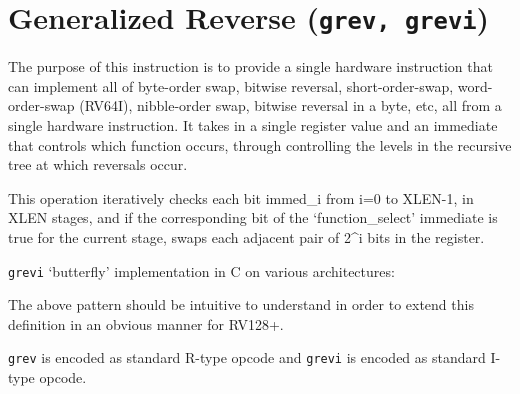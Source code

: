 
\section{Generalized Reverse (\texttt{grev,\ grevi})}

The purpose of this instruction is to provide a single hardware
instruction that can implement all of byte-order swap, bitwise reversal,
short-order-swap, word-order-swap (RV64I), nibble-order swap, bitwise
reversal in a byte, etc, all from a single hardware instruction. It
takes in a single register value and an immediate that controls which
function occurs, through controlling the levels in the recursive tree at
which reversals occur.

This operation iteratively checks each bit immed\_i from i=0 to XLEN-1,
in XLEN stages, and if the corresponding bit of the `function\_select'
immediate is true for the current stage, swaps each adjacent pair of
2\^{}i bits in the register.

\texttt{grevi} `butterfly' implementation in C on various architectures:



The above pattern should be intuitive to understand in order to extend
this definition in an obvious manner for RV128+.



\texttt{grev} is encoded as standard R-type opcode and \texttt{grevi} is
encoded as standard I-type opcode.

